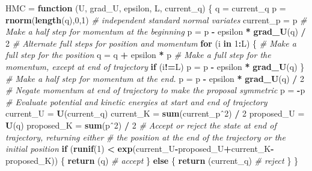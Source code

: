 \documentclass[
]{book}
\newenvironment{Shaded}{\begin{snugshade}}{\end{snugshade}}
\newcommand{\CommentTok}[1]{\textcolor[rgb]{0.56,0.35,0.01}{\textit{#1}}}
\newcommand{\ControlFlowTok}[1]{\textcolor[rgb]{0.13,0.29,0.53}{\textbf{#1}}}
\newcommand{\DecValTok}[1]{\textcolor[rgb]{0.00,0.00,0.81}{#1}}
\newcommand{\KeywordTok}[1]{\textcolor[rgb]{0.13,0.29,0.53}{\textbf{#1}}}
\newcommand{\NormalTok}[1]{#1}
\newcommand{\OperatorTok}[1]{\textcolor[rgb]{0.81,0.36,0.00}{\textbf{#1}}}
\newcommand{\StringTok}[1]{\textcolor[rgb]{0.31,0.60,0.02}{#1}}
\theoremstyle{definition}
\theoremstyle{definition}
\theoremstyle{definition}
\theoremstyle{remark}
\begin{document}
\begin{Shaded}
\begin{Highlighting}[]
\NormalTok{HMC =}\StringTok{ }\ControlFlowTok{function}\NormalTok{ (U, grad_U, epsilon, L, current_q)}
\NormalTok{  \{}
\NormalTok{    q =}\StringTok{ }\NormalTok{current_q}
\NormalTok{    p =}\StringTok{ }\KeywordTok{rnorm}\NormalTok{(}\KeywordTok{length}\NormalTok{(q),}\DecValTok{0}\NormalTok{,}\DecValTok{1}\NormalTok{)  }\CommentTok{# independent standard normal variates}
\NormalTok{    current_p =}\StringTok{ }\NormalTok{p}
    \CommentTok{# Make a half step for momentum at the beginning}
\NormalTok{    p =}\StringTok{ }\NormalTok{p }\OperatorTok{-}\StringTok{ }\NormalTok{epsilon }\OperatorTok{*}\StringTok{ }\KeywordTok{grad_U}\NormalTok{(q) }\OperatorTok{/}\StringTok{ }\DecValTok{2}
    \CommentTok{# Alternate full steps for position and momentum}
    \ControlFlowTok{for}\NormalTok{ (i }\ControlFlowTok{in} \DecValTok{1}\OperatorTok{:}\NormalTok{L)}
\NormalTok{    \{}
      \CommentTok{# Make a full step for the position}
\NormalTok{      q =}\StringTok{ }\NormalTok{q }\OperatorTok{+}\StringTok{ }\NormalTok{epsilon }\OperatorTok{*}\StringTok{ }\NormalTok{p}
      \CommentTok{# Make a full step for the momentum, except at end of trajectory}
      \ControlFlowTok{if}\NormalTok{ (i}\OperatorTok{!=}\NormalTok{L) p =}\StringTok{ }\NormalTok{p }\OperatorTok{-}\StringTok{ }\NormalTok{epsilon }\OperatorTok{*}\StringTok{ }\KeywordTok{grad_U}\NormalTok{(q)}
\NormalTok{\}}
    \CommentTok{# Make a half step for momentum at the end.}
\NormalTok{    p =}\StringTok{ }\NormalTok{p }\OperatorTok{-}\StringTok{ }\NormalTok{epsilon }\OperatorTok{*}\StringTok{ }\KeywordTok{grad_U}\NormalTok{(q) }\OperatorTok{/}\StringTok{ }\DecValTok{2}
    \CommentTok{# Negate momentum at end of trajectory to make the proposal symmetric}
\NormalTok{    p =}\StringTok{ }\OperatorTok{-}\NormalTok{p}
    \CommentTok{# Evaluate potential and kinetic energies at start and end of trajectory}
\NormalTok{    current_U =}\StringTok{ }\KeywordTok{U}\NormalTok{(current_q)}
\NormalTok{    current_K =}\StringTok{ }\KeywordTok{sum}\NormalTok{(current_pˆ2) }\OperatorTok{/}\StringTok{ }\DecValTok{2}
\NormalTok{    proposed_U =}\StringTok{ }\KeywordTok{U}\NormalTok{(q)}
\NormalTok{    proposed_K =}\StringTok{ }\KeywordTok{sum}\NormalTok{(pˆ2) }\OperatorTok{/}\StringTok{ }\DecValTok{2}
    \CommentTok{# Accept or reject the state at end of trajectory, returning either}
    \CommentTok{# the position at the end of the trajectory or the initial position}
    \ControlFlowTok{if}\NormalTok{ (}\KeywordTok{runif}\NormalTok{(}\DecValTok{1}\NormalTok{) }\OperatorTok{<}\StringTok{ }\KeywordTok{exp}\NormalTok{(current_U}\OperatorTok{-}\NormalTok{proposed_U}\OperatorTok{+}\NormalTok{current_K}\OperatorTok{-}\NormalTok{proposed_K))}
\NormalTok{    \{}
      \KeywordTok{return}\NormalTok{ (q)  }\CommentTok{# accept}
\NormalTok{    \}}
\ControlFlowTok{else}\NormalTok{ \{}
      \KeywordTok{return}\NormalTok{ (current_q)  }\CommentTok{# reject}
\NormalTok{    \}}
\NormalTok{\}}
\end{Highlighting}
\end{Shaded}
\end{document}
